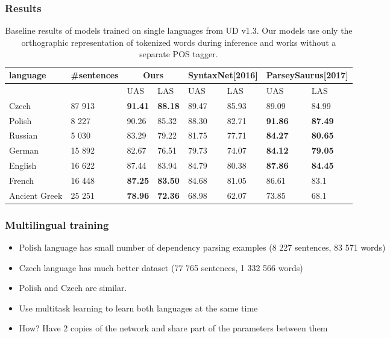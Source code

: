 \documentclass{beamer}
\begin{document}
\begin{frame}
    \frametitle{Results}
    {\scriptsize
    \begin{table}[!htbp]
      \centering
      \begin{tabular}{l l | l l | l l | l l}
          language & \#sentences & \multicolumn{2}{c|}{Ours} & \multicolumn{2}{c|}{SyntaxNet[2016]} & \multicolumn{2}{c}{ParseySaurus[2017]} \\ \hline
        & & UAS & LAS & UAS & LAS & UAS & LAS\\ \hline
        Czech & 87 913 & \textbf{91.41} & \textbf{88.18} & 89.47 & 85.93 & 89.09 & 84.99 \\
        Polish & 8 227 & 90.26 & 85.32 & 88.30 & 82.71 & \textbf{91.86} & \textbf{87.49}\\
        Russian & 5 030 & 83.29 & 79.22 & 81.75 & 77.71 & \textbf{84.27} & \textbf{80.65} \\
        German & 15 892 & 82.67 & 76.51 & 79.73 & 74.07 & \textbf{84.12} & \textbf{79.05}\\
        English & 16 622 & 87.44 & 83.94 & 84.79 & 80.38 & \textbf{87.86} & \textbf{84.45}\\ 
        French & 16 448 & \textbf{87.25} & \textbf{83.50} & 84.68 & 81.05 & 86.61 & 83.1\\
        Ancient Greek & 25 251 & \textbf{78.96} & \textbf{72.36} & 68.98 & 62.07 & 73.85 & 68.1
      \end{tabular}
      \caption{Baseline results of models trained on single languages from
        UD v1.3. Our models use only the orthographic representation of
        tokenized words during inference and works without a separate POS tagger.}
      \label{tab:universal}
    \end{table}
    }
\end{frame}

\begin{frame}
    \frametitle{Multilingual training}
    \begin{itemize}
        \item Polish language has small number of dependency parsing examples (8 227 sentences, 83 571 words)
        \item Czech language has much better dataset (77 765 sentences, 1 332 566 words)
        \item Polish and Czech are similar.
        \item Use multitask learning to learn both languages at the same time
        \item How? Have 2 copies of the network and share part of the parameters between them
    \end{itemize}
\end{frame}
\end{document}
